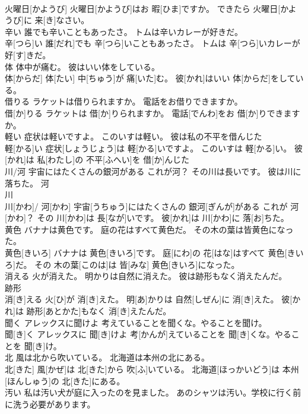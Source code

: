 \documentclass[8pt]{extreport}
\begin{document}
\begin{CJK}{UTF8}{min}
\\	火曜日[かようび] 火曜日[かようび]はお 暇[ひま]ですか。 できたら 火曜日[かようび]に 来[き]なさい。
\\	辛い 誰でも辛いこともあったさ。 トムは辛いカレーが好きだ。	
\\	辛[つら]い 誰[だれ]でも 辛[つら]いこともあったさ。 トムは 辛[つら]いカレーが 好[す]きだ。
\\	体 体中が痛む。 彼はいい体をしている。	
\\	体[からだ] 体[たい] 中[ちゅう]が 痛[いた]む。 彼[かれ]はいい 体[からだ]をしている。
\\	借りる ラケットは借りられますか。 電話をお借りできますか。	
\\	借[か]りる ラケットは 借[か]りられますか。 電話[でんわ]をお 借[か]りできますか。
\\	軽い 症状は軽いですよ。 このいすは軽い。 彼は私の不平を借んじた	
\\	軽[かる]い 症状[しょうじょう]は 軽[かる]いですよ。 このいすは 軽[かる]い。 彼[かれ]は 私[わたし]の 不平[ふへい]を 借[か]んじた
\\	川/河 宇宙にはたくさんの銀河がある これが河？ その川は長いです。 彼は川に落ちた。	河 
\\	川 
\\	川[かわ]/ 河[かわ] 宇宙[うちゅう]にはたくさんの 銀河[ぎんが]がある これが 河[かわ]？ その 川[かわ]は 長[なが]いです。 彼[かれ]は 川[かわ]に 落[お]ちた。
\\	黄色 バナナは黄色です。 庭の花はすべて黄色だ。 その木の葉は皆黄色になった。	
\\	黄色[きいろ] バナナは 黄色[きいろ]です。 庭[にわ]の 花[はな]はすべて 黄色[きいろ]だ。 その 木の葉[このは]は 皆[みな] 黄色[きいろ]になった。
\\	消える 火が消えた。 明かりは自然に消えた。 彼は跡形もなく消えたんだ。	
\\	跡形 
\\	消[き]える 火[ひ]が 消[き]えた。 明[あ]かりは 自然[しぜん]に 消[き]えた。 彼[かれ]は 跡形[あとかた]もなく 消[き]えたんだ。
\\	聞く アレックスに聞けよ 考えていることを聞くな。やることを聞け。	
\\	聞[き]く アレックスに 聞[き]けよ 考[かんが]えていることを 聞[き]くな。やることを 聞[き]け。
\\	北 風は北から吹いている。 北海道は本州の北にある。	
\\	北[きた] 風[かぜ]は 北[きた]から 吹[ふ]いている。 北海道[ほっかいどう]は 本州[ほんしゅう]の 北[きた]にある。
\\	汚い 私は汚い犬が庭に入ったのを見ました。 あのシャツは汚い。学校に行く前に洗う必要があります。	

\end{CJK}
\end{document}
